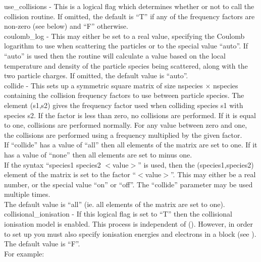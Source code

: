 {\emphtext use\_collisions} - This is a logical flag which determines whether
  or not to call the collision routine. If omitted, the default is ``T'' if any
  of the frequency factors are non-zero (see below) and ``F'' otherwise.\\

{\emphtext coulomb\_log} - This may either be set to a real value, specifying
  the Coulomb logarithm to use when scattering the particles or to the special
  value ``auto''. If ``auto'' is used then the routine will calculate a value
  based on the local temperature and density of the particle species being
  scattered, along with the two particle charges.  If omitted,
  the default value is ``auto''.\\

{\emphtext collide} - This sets up a symmetric square matrix of size
  nspecies$\,\times\,$nspecies containing the collision frequency factors to
  use between particle species. The element (s1,s2) gives the frequency factor
  used when colliding species s1 with species s2.  If the factor is less than
  zero, no collisions are performed.  If it is equal to one, collisions are
  performed normally.  For any value between zero and one, the collisions are
  performed using a frequency multiplied by the given factor.\\
  If ``collide'' has a value of ``all'' then all elements of the matrix are
  set to one. If it has a value of ``none'' then all elements are set to minus
  one.\\
  If the syntax ``species1 species2 $<$value$>$'' is used, then the
  (species1,species2) element of the matrix is set to the factor
  ``$<$value$>$''.  This may either be a real number, or the special value
  ``on'' or ``off''. The ``collide'' parameter may be used multiple times.\\
  The default value is ``all'' (ie. all elements of the matrix are set to
  one).\\

{\emphtext collisional\_ionisation} - If this logical flag is set to ``T''
  then the collisional ionisation model is enabled. This process is independent
  of  (). However, in order to
  set up 
  you must also specify ionisation energies and electrons in a
   block (see ). The default value
  is ``F''.\\

For example:

